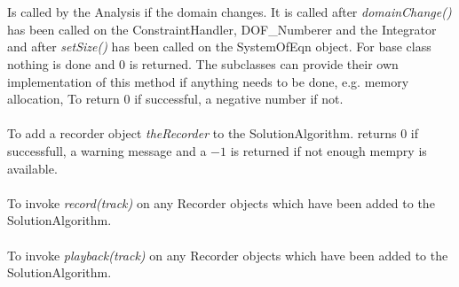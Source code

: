   \\
 \\
Is called by the Analysis if the domain changes. It is called after
{\em domainChange()} has been called on the ConstraintHandler,
DOF\_Numberer and the Integrator and after {\em setSize()} has been
called on the SystemOfEqn object. For base class nothing is done and
$0$ is returned. The subclasses can provide their own implementation
of this method if anything needs to be done, e.g. memory allocation,
To return $0$ if successful, a negative number if not. \\


\\
To add a recorder object {\em theRecorder} to the
SolutionAlgorithm. returns $0$ if successfull, a warning message and a
$-1$ is returned if not enough mempry is available. \\

 \\
To invoke {\em record(track)} on any Recorder objects which have been added to the
SolutionAlgorithm. \\

 \\
To invoke {\em playback(track)} on any Recorder objects which have been added to the
SolutionAlgorithm. \\






